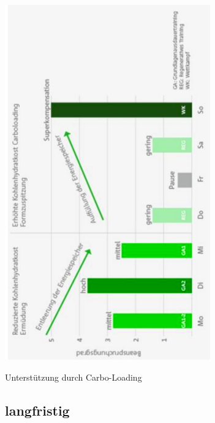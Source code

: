 \begin{minipage}{0.35\textwidth}
\includegraphics[width=\textwidth]{pictures/carbo_loading}

Unterstützung durch Carbo-Loading
\end{minipage}

\subsection{langfristig}

